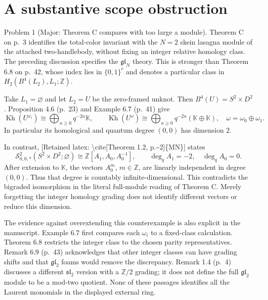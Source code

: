 \documentclass[10pt]{article}
\begin{document}
\section*{A substantive scope obstruction}
Problem 1 (Major: Theorem C compares with too large a module).  Theorem C on p. 3 identifies the total-color invariant with the \(N=2\) skein lasagna module of the attached two-handlebody, without fixing an integer relative homology class. The preceding discussion specifies the \(\mathfrak{gl}_N\) theory. This is stronger than Theorem 6.8 on p. 42, whose index lies in \(\{0,1\}^r\) and denotes a particular class in \(H_2(B^4(L_2),L_1;\mathbb Z)\).\par
Take \(L_1=\varnothing\) and let \(L_2=U\) be the zero-framed unknot. Then \(B^4(U)=S^2\times D^2\). Proposition 4.6 (p. 23) and Example 6.7 (p. 41) give \[\operatorname{Kh}(U^{\omega_i})\cong\bigoplus_{n\geq0}q^{-2n}\mathbb K,
 \qquad
 \operatorname{Kh}(U^\omega)\cong
 \bigoplus_{n\geq0}q^{-2n}(\mathbb K\oplus\mathbb K),
 \quad \omega=\omega_0\oplus\omega_1.\] In particular its homological and quantum degree \((0,0)\) has dimension \(2\).\par
In contrast, [Retained latex: \textbackslash{}cite[Theorem 1.2, p.\textasciitilde{}2]\{MN\}] states \[\mathcal S^2_{0,0,*}(S^2\times D^2;\varnothing)
 \cong \mathbb Z[A_1,A_0,A_0^{-1}],
 \qquad \deg_q A_1=-2,\quad \deg_q A_0=0.\] After extension to \(\mathbb K\), the vectors \(A_0^m\), \(m\in\mathbb Z\), are linearly independent in degree \((0,0)\). Thus that degree is countably infinite-dimensional. This contradicts the bigraded isomorphism in the literal full-module reading of Theorem C. Merely forgetting the integer homology grading does not identify different vectors or reduce this dimension.\par
The evidence against overextending this counterexample is also explicit in the manuscript. Example 6.7 first compares each \(\omega_i\) to a fixed-class calculation. Theorem 6.8 restricts the integer class to the chosen parity representatives. Remark 6.9 (p. 43) acknowledges that other integer classes can have grading shifts and that \(\mathfrak{gl}_2\) foams would remove the discrepancy. Remark 1.4 (p. 4) discusses a different \(\mathfrak{sl}_2\) version with a \(\mathbb Z/2\) grading; it does not define the full \(\mathfrak{gl}_2\) module to be a mod-two quotient. None of these passages identifies all the Laurent monomials in the displayed external ring.\par
\end{document}
